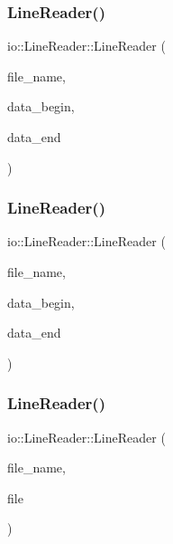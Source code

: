 \subsubsection{\texorpdfstring{Line\+Reader()}{LineReader()}\hspace{0.1cm}{\footnotesize\ttfamily [7/12]}}
{\footnotesize\ttfamily io\+::\+Line\+Reader\+::\+Line\+Reader (\begin{DoxyParamCaption}\item[{const char $\ast$}]{file\+\_\+name,  }\item[{const char $\ast$}]{data\+\_\+begin,  }\item[{const char $\ast$}]{data\+\_\+end }\end{DoxyParamCaption})\hspace{0.3cm}{\ttfamily [inline]}}

\mbox{\label{classio_1_1LineReader_a0a52d864b46442a253443cac1367366e}} 
\subsubsection{\texorpdfstring{Line\+Reader()}{LineReader()}\hspace{0.1cm}{\footnotesize\ttfamily [8/12]}}
{\footnotesize\ttfamily io\+::\+Line\+Reader\+::\+Line\+Reader (\begin{DoxyParamCaption}\item[{const std\+::string \&}]{file\+\_\+name,  }\item[{const char $\ast$}]{data\+\_\+begin,  }\item[{const char $\ast$}]{data\+\_\+end }\end{DoxyParamCaption})\hspace{0.3cm}{\ttfamily [inline]}}

\mbox{\label{classio_1_1LineReader_ad2a8943ba0848ae5052e2f5ad30c010e}} 
\subsubsection{\texorpdfstring{Line\+Reader()}{LineReader()}\hspace{0.1cm}{\footnotesize\ttfamily [9/12]}}
{\footnotesize\ttfamily io\+::\+Line\+Reader\+::\+Line\+Reader (\begin{DoxyParamCaption}\item[{const char $\ast$}]{file\+\_\+name,  }\item[{F\+I\+LE $\ast$}]{file }\end{DoxyParamCaption})\hspace{0.3cm}{\ttfamily [inline]}}

